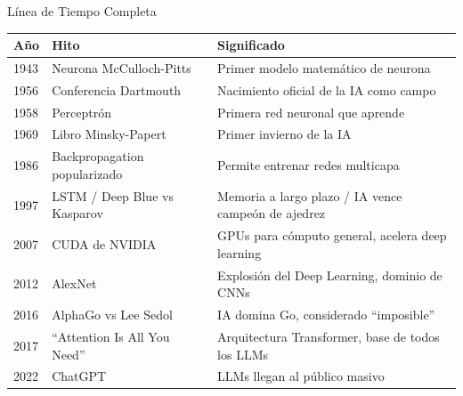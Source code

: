 \documentclass[aspectratio=169]{beamer}
\begin{document}
\begin{frame}{Línea de Tiempo Completa}
    \begin{table}[]
        \centering
        \renewcommand{\arraystretch}{1.1}
        \tiny
        \begin{tabular}{p{1.2cm} p{3.8cm} p{6.8cm}}
            \toprule
            \textbf{Año} & \textbf{Hito} & \textbf{Significado} \\
            \midrule
            1943 & Neurona McCulloch-Pitts & Primer modelo matemático de neurona \\
            1956 & Conferencia Dartmouth & Nacimiento oficial de la IA como campo \\
            1958 & Perceptrón & Primera red neuronal que aprende \\
            1969 & Libro Minsky-Papert & Primer invierno de la IA \\
            1986 & Backpropagation popularizado & Permite entrenar redes multicapa \\
            1997 & LSTM / Deep Blue vs Kasparov & Memoria a largo plazo / IA vence campeón de ajedrez \\
            2007 & CUDA de NVIDIA & GPUs para cómputo general, acelera deep learning \\
            2012 & AlexNet & Explosión del Deep Learning, dominio de CNNs \\
            2016 & AlphaGo vs Lee Sedol & IA domina Go, considerado ``imposible'' \\
            2017 & ``Attention Is All You Need'' & Arquitectura Transformer, base de todos los LLMs \\
            2022 & ChatGPT & LLMs llegan al público masivo \\
            \bottomrule
        \end{tabular}
    \end{table}
\end{frame}
\end{document}
